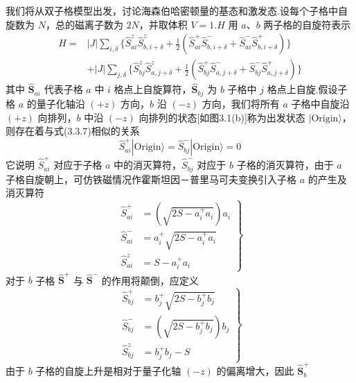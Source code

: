 我们将从双子格模型出发，讨论海森伯哈密顿量的基态和激发态.设每个子格中自旋数为 $N$，总的磁离子数为
$2N$，并取体积 $V=1$.$H$ 用 $a$、$b$ 两子格的自旋符表示
\begin{equation}
\begin{aligned}
  H={}&\left|J\right|\sum_{i,\delta}\biggl\{\hat{S}_{ai}^{z}\hat{S}_{b,i+\delta}^{z}
  +\frac{1}{2}\left(\hat{S}_{ai}^{+}\hat{S}_{b,i+\delta}^{-}+\hat{S}_{ai}^{-}\hat{S}_{b,i+\delta}^{+}\right)\biggr\}\\
  &+\left|J\right|\sum_{j,\delta}\biggl\{\hat{S}_{bj}^{z}\hat{S}_{a,j+\delta}^{z}
  +\frac{1}{2}\left(\hat{S}_{bj}^{+}\hat{S}_{a,j+\delta}^{-}+\hat{S}_{bj}^{-}\hat{S}_{a,j+\delta}^{+}\right)\biggr\}
\end{aligned}
\end{equation}
其中 $\hat{\boldsymbol{S}}_{ai}$ 代表子格 $a$ 中 $i$
格点上自旋算符，$\hat{\boldsymbol{S}}_{bj}$ 为 $b$ 子格中 $j$
格点上自旋.假设子格 $a$ 的量子化轴沿 $(+z)$ 方向，$b$ 沿 $(-z)$
方向，我们将所有 $a$ 子格中自旋沿 $(+z)$ 向排列，$b$ 中沿 $(-z)$
向排列的状态[如图3.1(b)]称为出发状态 $|\mathrm{Origin}\rangle$，则存在着与式(3.3.7)相似的关系
\begin{equation}
  \hat{S}_{ai}^{+}|\mathrm{Origin}\rangle=\hat{S}_{bj}^{-}|\mathrm{Origin}\rangle=0
\end{equation}
它说明 $\hat{S}_{ai}^{+}$ 对应于子格 $a$ 中的消灭算符，$\hat{S}_{bj}^{-}$
对应于 $b$ 子格的消灭算符，由于 $a$
子格自旋朝上，可仿铁磁情况作霍斯坦因－普里马可夫变换引入子格 $a$ 的产生及消灭算符
\begin{equation}
  \left.\begin{aligned}
    \hat{S}_{ai}^{+}&=\left(\sqrt{2S-a_i^{+}a_i}\right)a_i\\
    \hat{S}_{ai}^{-}&=a_i^{+}\sqrt{2S-a_i^{+}a_i}\\
    \hat{S}_{ai}^{z}&=S-a_i^{+}a_i
  \end{aligned}\right\}
\end{equation}
对于 $b$ 子格 $\hat{\boldsymbol{S}}^{+}$ 与 $\hat{\boldsymbol{S}}^{-}$ 的作用将颠倒，应定义
\begin{equation}
  \left.\begin{aligned}
    \hat{S}_{bj}^{+}&=b_j^{+}\sqrt{2S-b_j^{+}b_j}\\
    \hat{S}_{bj}^{-}&=\left(\sqrt{2S-b_j^{+}b_j}\right)b_j\\
    \hat{S}_{bj}^{z}&=b_j^{+}b_j-S
  \end{aligned}\right\}
\end{equation}
由于 $b$
子格的自旋上升是相对于量子化轴 $(-z)$ 的偏离增大，因此 $\hat{\boldsymbol{S}}_b^{+}$
